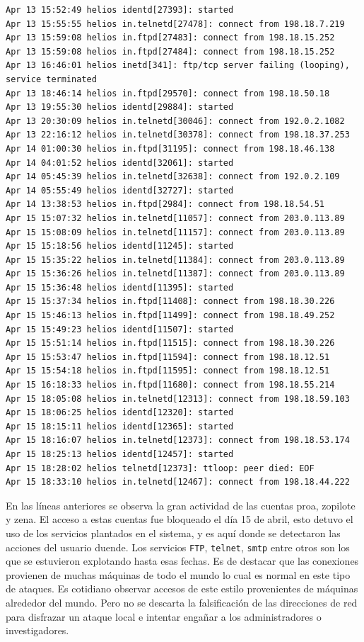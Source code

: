 \begin{lstlisting}[style=terminal]
Apr 13 15:52:49 helios identd[27393]: started
Apr 13 15:55:55 helios in.telnetd[27478]: connect from 198.18.7.219
Apr 13 15:59:08 helios in.ftpd[27483]: connect from 198.18.15.252
Apr 13 15:59:08 helios in.ftpd[27484]: connect from 198.18.15.252
Apr 13 16:46:01 helios inetd[341]: ftp/tcp server failing (looping), service terminated
Apr 13 18:46:14 helios in.ftpd[29570]: connect from 198.18.50.18
Apr 13 19:55:30 helios identd[29884]: started
Apr 13 20:30:09 helios in.telnetd[30046]: connect from 192.0.2.1082
Apr 13 22:16:12 helios in.telnetd[30378]: connect from 198.18.37.253
Apr 14 01:00:30 helios in.ftpd[31195]: connect from 198.18.46.138
Apr 14 04:01:52 helios identd[32061]: started
Apr 14 05:45:39 helios in.telnetd[32638]: connect from 192.0.2.109
Apr 14 05:55:49 helios identd[32727]: started
Apr 14 13:38:53 helios in.ftpd[2984]: connect from 198.18.54.51
Apr 15 15:07:32 helios in.telnetd[11057]: connect from 203.0.113.89
Apr 15 15:08:09 helios in.telnetd[11157]: connect from 203.0.113.89
Apr 15 15:18:56 helios identd[11245]: started
Apr 15 15:35:22 helios in.telnetd[11384]: connect from 203.0.113.89
Apr 15 15:36:26 helios in.telnetd[11387]: connect from 203.0.113.89
Apr 15 15:36:48 helios identd[11395]: started
Apr 15 15:37:34 helios in.ftpd[11408]: connect from 198.18.30.226
Apr 15 15:46:13 helios in.ftpd[11499]: connect from 198.18.49.252
Apr 15 15:49:23 helios identd[11507]: started
Apr 15 15:51:14 helios in.ftpd[11515]: connect from 198.18.30.226
Apr 15 15:53:47 helios in.ftpd[11594]: connect from 198.18.12.51
Apr 15 15:54:18 helios in.ftpd[11595]: connect from 198.18.12.51
Apr 15 16:18:33 helios in.ftpd[11680]: connect from 198.18.55.214
Apr 15 18:05:08 helios in.telnetd[12313]: connect from 198.18.59.103
Apr 15 18:06:25 helios identd[12320]: started
Apr 15 18:15:11 helios identd[12365]: started
Apr 15 18:16:07 helios in.telnetd[12373]: connect from 198.18.53.174
Apr 15 18:25:13 helios identd[12457]: started
Apr 15 18:28:02 helios telnetd[12373]: ttloop: peer died: EOF
Apr 15 18:33:10 helios in.telnetd[12467]: connect from 198.18.44.222
\end{lstlisting}

\vspace{1em}

 En las líneas anteriores se observa la gran actividad de las cuentas
proa, zopilote y zena. El acceso a estas cuentas fue bloqueado el día
15 de abril, esto detuvo el uso de los servicios plantados en el
sistema, y es aquí donde se detectaron las acciones del usuario
duende. Los servicios \texttt{FTP}, \texttt{telnet}, \texttt{smtp} entre otros son los que se
estuvieron explotando hasta esas fechas. Es de destacar que las
conexiones provienen de muchas máquinas de todo el mundo lo cual es
normal en este tipo de ataques. Es cotidiano observar accesos de este
estilo provenientes de máquinas alrededor del mundo. Pero no se descarta
la falsificación de las direcciones de red para disfrazar un ataque local e
intentar engañar a los administradores o investigadores.

